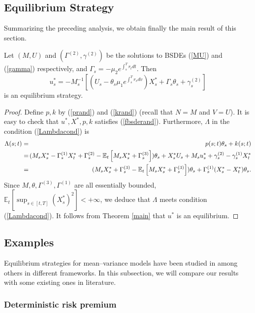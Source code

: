 \documentclass[final]{siamltex}
\begin{document}
\subsection{Equilibrium Strategy}
Summarizing the preceding analysis, we obtain finally the main result of this section.
\begin{theorem}\label{randmain}
Let $(M,U)$ and $(\Gamma^{(2)},\gamma^{(2)})$ be the solutions to BSDEs (\ref{MU}) and (\ref{gamma}) respectively, and $\Gamma_s=-\mu_2 e^{\int_s^T r_t dt}$. Then
$$u^*_s=-M_s^{-1}\left[(U_s-\theta_s \mu_1 e^{\int_s^Tr_vdv}) X^*_s+\Gamma_s\theta_s+\gamma^{(2)}_s\right]$$
is an equilibrium strategy.
\end{theorem}
\begin{proof}
Define  $p, k$ by (\ref{prand}) and (\ref{krand}) (recall that
$N=M$ and $V=U$). It is easy to check that $u^*, X^*, p, k$
satisfies (\ref{fbsderand}). Furthermore,  $\Lambda$ in the
condition (\ref{Lambdacond}) is
\begin{eqnarray*}
\Lambda(s;t)&=&p(s;t)\theta_s+k(s;t)\\
&=&\hspace{-0.3cm}(M_sX^*_s-\Gamma^{(1)}_sX^*_t+\Gamma^{(2)}_s-{\mathbb{E}_t\left[{M_sX^*_s+\Gamma^{(3)}_s}\right]})\theta_s
 +X_s^*U_s+M_s u_s^* +\gamma^{(2)}_s-\gamma^{(1)}_sX^*_t\\
&=&(M_sX^*_s+\Gamma^{(3)}_s-{\mathbb{E}_t\left[{M_sX^*_s+\Gamma^{(3)}_s}\right]})\theta_s
       +\Gamma^{(1)}_s(X^*_s-X^*_t)\theta_s.
\end{eqnarray*}
Since $M, \theta, \Gamma^{(3)}, \Gamma^{(1)}$ are all essentially bounded,
${\mathbb{E}_t\left[{\sup_{s\in [t,T]}(X^*_s)^2}\right]}<+\infty$, we deduce  that
$\Lambda$ meets condition (\ref{Lambdacond}).  It follows from  Theorem
\ref{main} that $u^*$ is an equilibrium.
\end{proof}

\subsection{Examples}
Equilibrium strategies for mean--variance models have been studied  in \cite{Basak,BM,BMZ} among others in different
frameworks.  In this subsection,  we will compare our results with some existing ones in literature.

\subsubsection{Deterministic risk premium}
\end{document}
